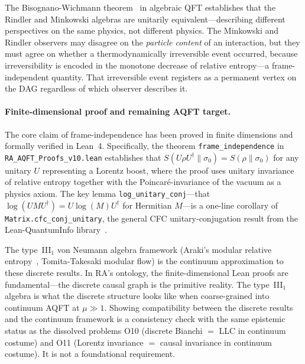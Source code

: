 \documentclass[11pt,a4paper]{article}
\theoremstyle{plain}
\theoremstyle{definition}
\theoremstyle{remark}
\begin{document}
The Bisognano-Wichmann theorem~\citep{BisognanoWichmann1975} in algebraic QFT
establishes that the Rindler and Minkowski algebras are unitarily
equivalent---describing different perspectives on the same physics, not different
physics. The Minkowski and Rindler observers may disagree on the \emph{particle
content} of an interaction, but they must agree on whether a thermodynamically
irreversible event occurred, because irreversibility is encoded in the
monotone decrease of relative entropy---a frame-independent quantity. That
irreversible event registers as a permanent vertex on the DAG regardless of which
observer describes it.

\paragraph{Finite-dimensional proof and remaining AQFT target.}
The core claim of frame-independence has been proved in finite dimensions and
formally verified in Lean~4. Specifically, the theorem
\texttt{frame\_independence} in \texttt{RA\_AQFT\_Proofs\_v10.lean} establishes
that $S(U\rho U^\dagger \| \sigma_0) = S(\rho \| \sigma_0)$ for any unitary $U$
representing a Lorentz boost, where the proof uses unitary invariance of relative
entropy together with the Poincar\'{e}-invariance of the vacuum as a physics
axiom. The key lemma \texttt{log\_unitary\_conj}---that $\log(UMU^\dagger) =
U\log(M)U^\dagger$ for Hermitian $M$---is a one-line corollary of
\texttt{Matrix.cfc\_conj\_unitary}, the general CFC unitary-conjugation result
from the Lean-QuantumInfo library~\citep{Meiburg2025LQI}.

The type~III$_1$ von Neumann algebra framework (Araki's modular relative
entropy~\citep{Araki1976}, Tomita-Takesaki modular flow) is the continuum
approximation to these discrete results. In RA's ontology, the
finite-dimensional Lean proofs are fundamental---the discrete causal graph
is the primitive reality. The type~III$_1$ algebra is what the discrete
structure looks like when coarse-grained into continuum AQFT at
$\mu \gg 1$. Showing compatibility between the discrete results and
the continuum framework is a consistency check with the same epistemic
status as the dissolved problems O10 (discrete Bianchi $=$ LLC in
continuum costume) and O11 (Lorentz invariance $=$ causal invariance in
continuum costume). It is not a foundational requirement.
\end{document}
